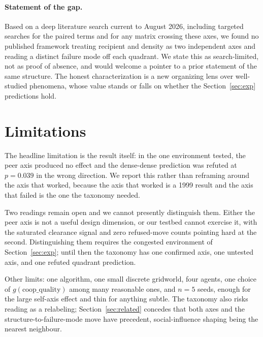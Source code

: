 \documentclass[11pt]{article}
\begin{document}
\paragraph{Statement of the gap.} Based on a deep literature search current to August 2026, including targeted searches for the paired terms and for any matrix crossing these axes, we found no published framework treating recipient and density as two independent axes and reading a distinct failure mode off each quadrant. We state this as search-limited, not as proof of absence, and would welcome a pointer to a prior statement of the same structure. The honest characterization is a new organizing lens over well-studied phenomena, whose value stands or falls on whether the Section~\ref{sec:exp} predictions hold.

\section{Limitations}
The headline limitation is the result itself: in the one environment tested, the peer axis produced no effect and the dense-dense prediction was refuted at $p=0.039$ in the wrong direction. We report this rather than reframing around the axis that worked, because the axis that worked is a 1999 result and the axis that failed is the one the taxonomy needed.

Two readings remain open and we cannot presently distinguish them. Either the peer axis is not a useful design dimension, or our testbed cannot exercise it, with the saturated clearance signal and zero refused-move counts pointing hard at the second. Distinguishing them requires the congested environment of Section~\ref{sec:exp}; until then the taxonomy has one confirmed axis, one untested axis, and one refuted quadrant prediction.

Other limits: one algorithm, one small discrete gridworld, four agents, one choice of $g(\text{coop\_quality})$ among many reasonable ones, and $n=5$ seeds, enough for the large self-axis effect and thin for anything subtle. The taxonomy also risks reading as a relabeling; Section~\ref{sec:related} concedes that both axes and the structure-to-failure-mode move have precedent, social-influence shaping being the nearest neighbour.
\end{document}
